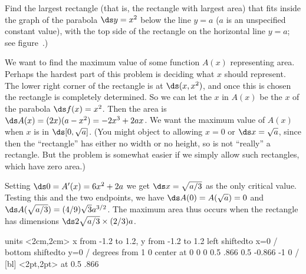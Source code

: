 \begin{example} Find the largest rectangle (that is, the rectangle with largest
area) that fits inside the graph of the parabola $\ds y=x^2$ below the
line $y=a$ ($a$ is an unspecified constant value), with the top side of
the rectangle on the horizontal line $y=a$; see
figure~.)

We want to find the maximum value of some function $A(x)$ representing
area.  Perhaps the hardest part of this problem is deciding what $x$
should represent. The lower right corner of the rectangle is at
$\ds (x,x^2)$, and once this is chosen the rectangle is completely
determined. So we can let the $x$ in $A(x)$ be the $x$ of the parabola
$\ds f(x)=x^2$.  Then the area is $\ds A(x)=(2x)(a-x^2)=-2x^3+2ax$. We want
the maximum value of $A(x)$ when $x$ is in $\ds [0,\sqrt{a}]$. (You might
object to allowing $x=0$ or $\ds x=\sqrt{a}$, since then the ``rectangle''
has either no width or no height, so is not ``really'' a
rectangle. But the problem is somewhat easier if we simply allow such
rectangles, which have zero area.) 

Setting $\ds 0=A'(x)=6x^2+2a$ we get $\ds x=\sqrt{a/3}$ as the only critical
value. Testing this and the two endpoints, we have
$\ds A(0)=A(\sqrt{a})=0$ and $\ds A(\sqrt{a/3})=(4/9)\sqrt{3}a^{3/2}$. The
maximum area thus occurs when the rectangle has dimensions
$\ds 2\sqrt{a/3}\times (2/3)a$.
\end{example}

\figure
\vbox{\beginpicture
\normalgraphs
\ninepoint
\setcoordinatesystem units <2cm,2cm>
\setplotarea x from -1.2 to 1.2, y from -1.2 to 1.2
\axis left shiftedto x=0 /
\axis bottom shiftedto y=0 /
\setquadratic
{} degrees from 1 0 center at 0 0
\setlinear
{} 0 0.5 .866 0.5 -0.866 -1 0 /
 [bl] <2pt,2pt> at 0.5 .866
\endpicture}


